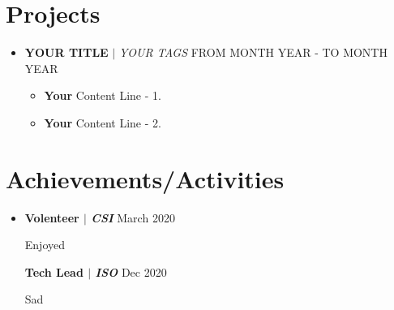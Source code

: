 \documentclass[letterpaper,5pt]{article}
\begin{document}
    
    \section{Projects}
    
        \begin{itemize}[leftmargin=0.15in,label={}]
          \item{
            \textbf{YOUR TITLE} $|$ \emph{YOUR TAGS}
          }
          \hfill FROM MONTH YEAR - TO MONTH YEAR
          \begin{itemize} 
            \vspace{-5pt}
            \item[\textbullet{}]\textbf{Your} Content Line - 1.
            \vspace{-5pt}
            \item[\textbullet{}]\textbf{Your} Content Line - 2.
          \end{itemize}
          \end{itemize}

        


    
      
    
    
    
    
          \section{Achievements/Activities}
          \begin{itemize}[leftmargin=0.15in, label={}]
          \item[]
          
            \textbf{Volenteer $|$ \emph{CSI} } \hfill{March 2020}

                \hspace{0.15in}
                \textbullet{} Enjoyed 
                \newline

                \vspace{-10pt} 
                
            \textbf{Tech Lead $|$ \emph{ISO} } \hfill{Dec 2020}

                \hspace{0.15in}
                \textbullet{} Sad 
                \newline

                \vspace{-10pt} 
                
                
            \end{itemize}
          
      
\end{document}
